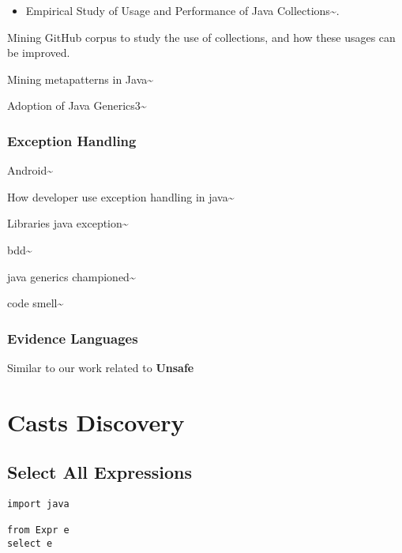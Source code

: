 \begin{itemize}
\item Empirical Study of Usage and Performance of Java Collections\textasciitilde{}\cite{Costa:2017:ESU:3030207.3030221}.
\end{itemize}
Mining GitHub corpus to study the use of collections, and how these usages can be improved. 


Mining metapatterns in Java\textasciitilde{}\cite{DBLP:conf/msr/PosnettBD10} 


Adoption of Java Generics3\textasciitilde{}\cite{Parnin:2013:AUJ:2589712.2589717} 

\subsection{Exception Handling} 

Android\textasciitilde{}\cite{7180074} 

How developer use exception handling in java\textasciitilde{}\cite{Asaduzzaman:2016:DUE:2901739.2903500} 

Libraries java exception\textasciitilde{}\cite{Sena:2016:UEH:2901739.2901757} 

bdd\textasciitilde{}\cite{Lhotak:2008:EBC:1391984.1391987} 

java generics championed\textasciitilde{}\cite{Parnin:2011:JGA:1985441.1985446} 

code smell\textasciitilde{}\cite{Counsell:2010:SCS:1809223.1809228} 

\subsection{Evidence Languages} 

Similar to our work related to \textbf{Unsafe} \cite{Mastrangelo:2015:UYO:2814270.2814313} 

\chapter{Casts Discovery}
\label{sec:org8b3b70c}

\section{Select All Expressions}
\label{sec:org03ce0ad}

\lstset{language=ql,label= ,caption= ,captionpos=b,numbers=none}
\begin{lstlisting}
import java

from Expr e
select e
\end{lstlisting}


